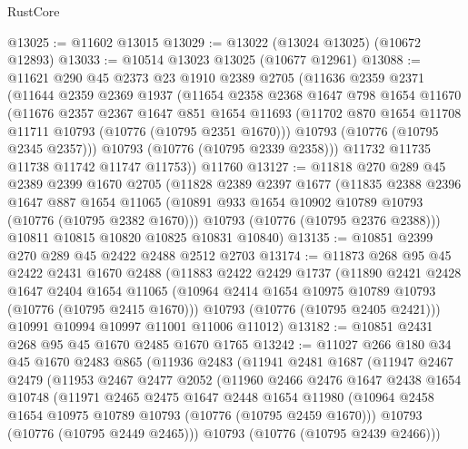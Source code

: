 \begin{lexlean}{RustCore}
\begin{coremodule}
@13025 := @11602 @13015
@13029 := @13022 (@13024 @13025) (@10672 @12893)
@13033 := @10514 @13023 @13025 (@10677 @12961)
@13088 := @11621
    @290
    @45
    @2373
    @23
    @1910
    @2389
    @2705
    (@11636
      @2359
      @2371
      (@11644
        @2359
        @2369
        @1937
        (@11654
          @2358
          @2368
          @1647
          @798
          @1654
          @11670
          (@11676
            @2357
            @2367
            @1647
            @851
            @1654
            @11693
            (@11702 @870 @1654 @11708 @11711 @10793 (@10776 (@10795 @2351 @1670)))
            @10793
            (@10776 (@10795 @2345 @2357)))
          @10793
          (@10776 (@10795 @2339 @2358)))
        @11732
        @11735
        @11738
        @11742
        @11747
        @11753))
    @11760
@13127 := @11818
    @270
    @289
    @45
    @2389
    @2399
    @1670
    @2705
    (@11828
      @2389
      @2397
      @1677
      (@11835
        @2388
        @2396
        @1647
        @887
        @1654
        @11065
        (@10891 @933 @1654 @10902 @10789 @10793 (@10776 (@10795 @2382 @1670)))
        @10793
        (@10776 (@10795 @2376 @2388)))
      @10811
      @10815
      @10820
      @10825
      @10831
      @10840)
@13135 := @10851 @2399 @270 @289 @45 @2422 @2488 @2512 @2703
@13174 := @11873
    @268
    @95
    @45
    @2422
    @2431
    @1670
    @2488
    (@11883
      @2422
      @2429
      @1737
      (@11890
        @2421
        @2428
        @1647
        @2404
        @1654
        @11065
        (@10964 @2414 @1654 @10975 @10789 @10793 (@10776 (@10795 @2415 @1670)))
        @10793
        (@10776 (@10795 @2405 @2421)))
      @10991
      @10994
      @10997
      @11001
      @11006
      @11012)
@13182 := @10851 @2431 @268 @95 @45 @1670 @2485 @1670 @1765
@13242 := @11027
    @266
    @180
    @34
    @45
    @1670
    @2483
    @865
    (@11936
      @2483
      (@11941
        @2481
        @1687
        (@11947
          @2467
          @2479
          (@11953
            @2467
            @2477
            @2052
            (@11960
              @2466
              @2476
              @1647
              @2438
              @1654
              @10748
              (@11971
                @2465
                @2475
                @1647
                @2448
                @1654
                @11980
                (@10964 @2458 @1654 @10975 @10789 @10793 (@10776 (@10795 @2459 @1670)))
                @10793
                (@10776 (@10795 @2449 @2465)))
              @10793
              (@10776 (@10795 @2439 @2466)))

\end{coremodule}
\end{lexlean}
